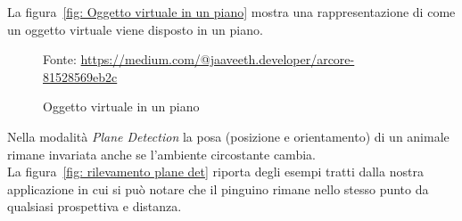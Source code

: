 \documentclass[crop=false, class=book]{standalone}
\begin{document}
	\clearpage
		\noindent
		La figura~\vref{fig: Oggetto virtuale in un piano} mostra una rappresentazione di come un oggetto virtuale viene disposto in un piano.
		\begin{figure}
			\centering
			{Fonte: \url{https://medium.com/@jaaveeth.developer/arcore-81528569eb2c}}
			\caption{Oggetto virtuale in un piano}
			\label{fig: Oggetto virtuale in un piano}
		\end{figure}	

		\noindent 
		Nella modalità \emph{Plane Detection} la posa (posizione e orientamento) di un animale rimane invariata anche se l'ambiente circostante cambia. 
		\\
		La figura~\vref{fig: rilevamento plane det} riporta degli esempi tratti dalla nostra applicazione in cui si può notare che il pinguino rimane nello stesso punto da qualsiasi prospettiva e distanza.
	
\end{document}
